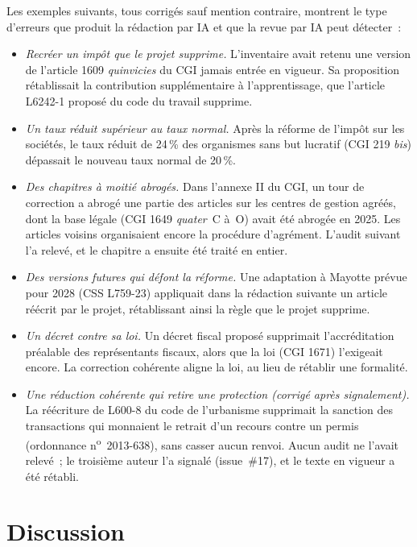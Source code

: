 \documentclass[11pt,a4paper]{article}
\begin{document}
Les exemples suivants, tous corrigés sauf mention contraire, montrent le type d'erreurs que produit la rédaction par IA et que la revue par IA peut détecter~:
\begin{itemize}
  \item \emph{Recréer un impôt que le projet supprime.} L'inventaire avait retenu une version de l'article 1609 \emph{quinvicies} du CGI jamais entrée en vigueur. Sa proposition rétablissait la contribution supplémentaire à l'apprentissage, que l'article L6242-1 proposé du code du travail supprime.
  \item \emph{Un taux \og réduit \fg{} supérieur au taux normal.} Après la réforme de l'impôt sur les sociétés, le taux réduit de 24\,\% des organismes sans but lucratif (CGI 219 \emph{bis}) dépassait le nouveau taux normal de 20\,\%.
  \item \emph{Des chapitres à moitié abrogés.} Dans l'annexe II du CGI, un tour de correction a abrogé une partie des articles sur les centres de gestion agréés, dont la base légale (CGI 1649 \emph{quater}~C à~O) avait été abrogée en 2025. Les articles voisins organisaient encore la procédure d'agrément. L'audit suivant l'a relevé, et le chapitre a ensuite été traité en entier.
  \item \emph{Des versions futures qui défont la réforme.} Une adaptation à Mayotte prévue pour 2028 (CSS L759-23) appliquait \og dans la rédaction suivante \fg{} un article réécrit par le projet, rétablissant ainsi la règle que le projet supprime.
  \item \emph{Un décret contre sa loi.} Un décret fiscal proposé supprimait l'accréditation préalable des représentants fiscaux, alors que la loi (CGI 1671) l'exigeait encore. La correction cohérente aligne la loi, au lieu de rétablir une formalité.
  \item \emph{Une réduction cohérente qui retire une protection (corrigé après signalement).} La réécriture de L600-8 du code de l'urbanisme supprimait la sanction des transactions qui monnaient le retrait d'un recours contre un permis (ordonnance n\textsuperscript{o}~2013-638), sans casser aucun renvoi. Aucun audit ne l'avait relevé~; le troisième auteur l'a signalé (issue~\#17), et le texte en vigueur a été rétabli.
\end{itemize}

\section{Discussion}
\label{sec:discussion}
\end{document}
